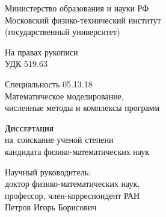 \documentclass[thesis.tex]{subfiles}
\begin{document}
\begin{titlepage}
\newpage

\begin{center}
    Министерство образования и науки РФ \\
    Московский физико-технический институт \\
    (государственный университет) \\
\end{center}

\vspace{0.3em}

\begin{flushright}
    На правах рукописи \\
    УДК 519.63
\end{flushright}

\vspace{1em}


\vspace{1em}

\centering{\textsc{\disser}}

\vspace{1.0em}

\begin{center}
    Специальность 05.13.18 \\
    Математическое моделирование,\\
    численные методы и комплексы программ
\end{center}

\vspace{0.5em}

\begin{center}
    \textsc{\textbf{Диссертация}} \\
    на~соискание ученой степени \\
    кандидата физико-математических наук
\end{center}

\vspace{1em}

\begin{flushright}
Научный руководитель:\\
доктор физико-математических наук,\\
профессор, член-корреспондент РАН\\
Петров Игорь Борисович
\end{flushright}

\vspace{\fill}

\end{titlepage}
\end{document}
